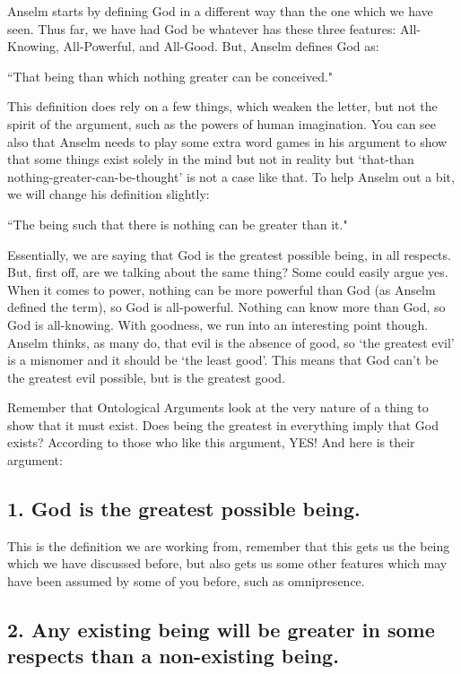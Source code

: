 Anselm starts by defining God in a different way than the one which we have seen. Thus far, we have had God be whatever has these three features: All-Knowing, All-Powerful, and All-Good. But, Anselm defines God as:
\begin{center}
``That being than which nothing greater can be conceived."
\end{center}
This definition does rely on a few things, which weaken the letter, but not the spirit of the argument, such as the powers of human imagination. You can see also that Anselm needs to play some extra word games in his argument to show that some things exist solely in the mind but not in reality but `that-than nothing-greater-can-be-thought' is not a case like that. To help Anselm out a bit, we will change his definition slightly: 
\begin{center}
 ``The being such that there is nothing can be greater than it."
\end{center}
Essentially, we are saying that God is the greatest possible being, in all respects. But, first off, are we talking about the same thing? Some could easily argue yes. When it comes to power, nothing can be more powerful than God (as Anselm defined the term), so God is all-powerful. Nothing can know more than God, so God is all-knowing. With goodness, we run into an interesting point though. Anselm thinks, as many do, that evil is the absence of good, so `the greatest evil' is a misnomer and it should be `the least good'. This means that God can't be the greatest evil possible, but is the greatest good.  

Remember that Ontological Arguments look at the very nature of a thing to show that it must exist. Does being the greatest in everything imply that God exists? According to those who like this argument, YES! And here is their argument:

\subsection{1. God is the greatest possible being.}

This is the definition we are working from, remember that this gets us the being which we have discussed before, but also gets us some other features which may have been assumed by some of you before, such as omnipresence. 

\subsection{2. Any existing being will be greater in some respects than a non-existing being.}

